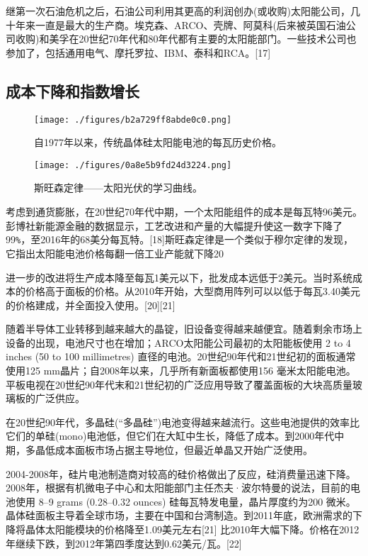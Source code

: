 继第一次石油危机之后，石油公司利用其更高的利润创办(或收购)太阳能公司，几十年来一直是最大的生产商。埃克森、ARCO、壳牌、阿莫科(后来被英国石油公司收购)和美孚在20世纪70年代和80年代都有主要的太阳能部门。一些技术公司也参加了，包括通用电气、摩托罗拉、IBM、泰科和RCA。[17]

\subsection{成本下降和指数增长}

\begin{figure}[ht]
\centering
\texttt{[image: ./figures/b2a729ff8abde0c0.png]}
\caption{自1977年以来，传统晶体硅太阳能电池的每瓦历史价格。} \label{fig_TYNDC_12}
\end{figure}

\begin{figure}[ht]
\centering
\texttt{[image: ./figures/0a8e5b9fd24d3224.png]}
\caption{斯旺森定律——太阳光伏的学习曲线。} \label{fig_TYNDC_13}
\end{figure}

考虑到通货膨胀，在20世纪70年代中期，一个太阳能组件的成本是每瓦特96美元。彭博社新能源金融的数据显示，工艺改进和产量的大幅提升使这一数字下降了99\verb|%|，至2016年的68美分每瓦特。[18]斯旺森定律是一个类似于穆尔定律的发现，它指出太阳能电池价格每翻一倍工业产能就下降20%

进一步的改进将生产成本降至每瓦1美元以下，批发成本远低于2美元。当时系统成本的价格高于面板的价格。从2010年开始，大型商用阵列可以以低于每瓦3.40美元的价格建成，并全面投入使用。[20][21]

随着半导体工业转移到越来越大的晶锭，旧设备变得越来越便宜。随着剩余市场上设备的出现，电池尺寸也在增加；ARCO太阳能公司最初的太阳能板使用 2 to 4 inches (50 to 100 millimetres) 直径的电池。20世纪90年代和21世纪初的面板通常使用125 mm晶片；自2008年以来，几乎所有新面板都使用156 毫米太阳能电池。平板电视在20世纪90年代末和21世纪初的广泛应用导致了覆盖面板的大块高质量玻璃板的广泛供应。

在20世纪90年代，多晶硅(“多晶硅”)电池变得越来越流行。这些电池提供的效率比它们的单硅(mono)电池低，但它们在大缸中生长，降低了成本。到2000年代中期，多晶低成本面板市场占据主导地位，但最近单晶又开始广泛使用。

2004-2008年，硅片电池制造商对较高的硅价格做出了反应，硅消费量迅速下降。2008年，根据有机微电子中心和太阳能部门主任杰夫·波尔特曼的说法，目前的电池使用 8–9 grams (0.28–0.32 ounces) 硅每瓦特发电量，晶片厚度约为200 微米。 晶体硅面板主导着全球市场，主要在中国和台湾制造。到2011年底，欧洲需求的下降将晶体太阳能模块的价格降至1.09美元左右[21] 比2010年大幅下降。价格在2012年继续下跌，到2012年第四季度达到0.62美元/瓦。[22]

